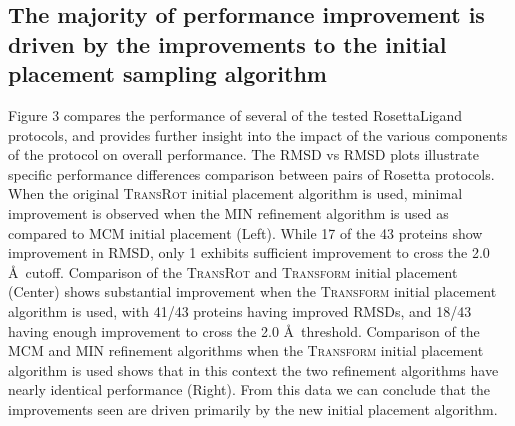 \subsection{The majority of performance improvement is driven by the improvements to the initial placement sampling algorithm}
Figure 3 compares the performance of several of the tested RosettaLigand protocols, and provides further insight into the impact of the various components of the protocol on overall performance.
The RMSD vs RMSD plots illustrate specific performance differences comparison between pairs of Rosetta protocols.
When the original \textsc{TransRot} initial placement algorithm is used, minimal improvement is observed when the MIN refinement algorithm is used as compared to MCM initial placement (Left).
While 17 of the 43 proteins show improvement in RMSD, only 1 exhibits sufficient improvement to cross the 2.0 \AA\ cutoff.
Comparison of the \textsc{TransRot} and \textsc{Transform} initial placement (Center) shows substantial improvement when the \textsc{Transform} initial placement algorithm is used, with 41/43 proteins having improved RMSDs, and 18/43 having enough improvement to cross the 2.0 \AA\ threshold.
Comparison of the MCM and MIN refinement algorithms when the \textsc{Transform} initial placement algorithm is used shows that in this context the two refinement algorithms have nearly identical performance (Right).
From this data we can conclude that the improvements seen are driven primarily by the new initial placement algorithm. 

